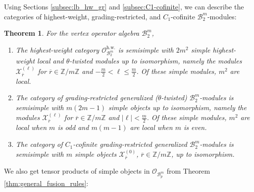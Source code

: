 \documentclass[11pt, reqno]{amsart}
\newtheorem{thm}{Theorem}[section]
\theoremstyle{definition}\newtheorem{defi}[thm]{Definition}
\theoremstyle{definition}\newtheorem{rem}[thm]{Remark}
\theoremstyle{definition}\newtheorem{exam}[thm]{Example}
\theoremstyle{definition}\newtheorem{assum}[thm]{Assumption}
\newcommand{\cB}{\mathcal{B}}
\newcommand{\cX}{\mathcal{X}}
\newcommand{\cO}{\mathcal{O}}
\newcommand{\ZZ}{\mathbb{Z}}
\begin{document}
Using Sections \ref{subsec:lb_hw_gr} and \ref{subsec:C1-cofinite}, we can describe the categories of highest-weight, grading-restricted, and $C_1$-cofinite $\cB_2^m$-modules:
\begin{thm}\label{thm:B2m_grad-rest}
For the vertex operator algebra $\cB_2^m$,
\begin{enumerate}

\item The highest-weight category $\cO_{\cB_2^m}^{\mathrm{h.w.}}$ is semisimple with $2m^2$ simple highest-weight local and $\theta$-twisted modules up to isomorphism, namely the modules $\cX_{\overline{r}}^{(\ell)}$ for $\overline{r}\in\ZZ/m\ZZ$ and $-\frac{m}{2}<\ell\leq\frac{m}{2}$. Of these simple modules, $m^2$ are local.

\item The category of grading-restricted generalized ($\theta$-twisted) $\cB_2^m$-modules is semisimple with $m(2m-1)$ simple objects up to isomorphism, namely the modules $\cX_{\overline{r}}^{(\ell)}$ for $\overline{r}\in\ZZ/m\ZZ$ and $\vert\ell\vert<\frac{m}{2}$. Of these simple modules, $m^2$ are local when $m$ is odd and $m(m-1)$ are local when $m$ is even.

\item The category of $C_1$-cofinite grading-restricted generalized $\cB_2^m$-modules is semisimple with $m$ simple objects $\cX_{\overline{r}}^{(0)}$, $\overline{r}\in\ZZ/m\ZZ$, up to isomorphism.


\end{enumerate}
\end{thm}

We also get tensor products of simple objects in $\cO_{\cB_p^m}$ from Theorem \ref{thm:general_fusion_rules}:
\end{document}
